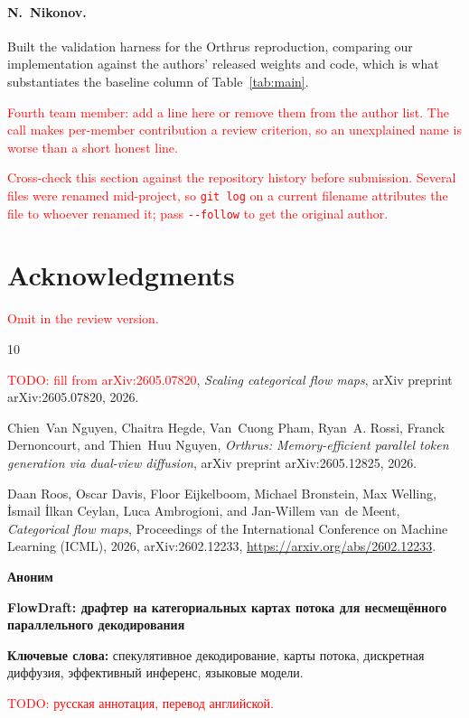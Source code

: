 \documentclass{zapiski}
\newcommand{\cm}[1]{\textcolor{red}{#1}}
\begin{document}
\paragraph{N.~Nikonov.} Built the validation harness for the Orthrus
reproduction, comparing our implementation against the authors' released
weights and code, which is what substantiates the baseline column of
Table~\ref{tab:main}.

\cm{Fourth team member: add a line here or remove them from the author list.
The call makes per-member contribution a review criterion, so an unexplained
name is worse than a short honest line.}

\cm{Cross-check this section against the repository history before submission.
Several files were renamed mid-project, so \texttt{git log} on a current
filename attributes the file to whoever renamed it; pass \texttt{-{}-follow} to
get the original author.}

\section*{Acknowledgments}
\cm{Omit in the review version.}

\providecommand{\bysame}{\leavevmode\hbox to3em{\hrulefill}\thinspace}
\providecommand{\href}[2]{#2}
\begin{thebibliography}{10}

\cm{TODO: fill from arXiv:2605.07820}, \emph{Scaling categorical flow maps},
  arXiv preprint arXiv:2605.07820, 2026.

Chien~Van Nguyen, Chaitra Hegde, Van~Cuong Pham, Ryan~A. Rossi, Franck
  Dernoncourt, and Thien~Huu Nguyen, \emph{Orthrus: Memory-efficient parallel
  token generation via dual-view diffusion}, arXiv preprint arXiv:2605.12825,
  2026.

Daan Roos, Oscar Davis, Floor Eijkelboom, Michael Bronstein, Max Welling,
  İsmail İlkan Ceylan, Luca Ambrogioni, and Jan-Willem van~de Meent,
  \emph{Categorical flow maps}, Proceedings of the International Conference on
  Machine Learning (ICML), 2026, arXiv:2602.12233,
  \url{https://arxiv.org/abs/2602.12233}.

\end{thebibliography}

\vspace{1cm}
\noindent\textbf{Аноним}

\smallskip
\noindent\textbf{FlowDraft: драфтер на категориальных картах потока для
несмещённого параллельного декодирования}

\smallskip
\noindent\textbf{Ключевые слова:} спекулятивное декодирование, карты потока,
дискретная диффузия, эффективный инференс, языковые модели.

\smallskip
\noindent\cm{TODO: русская аннотация, перевод английской.}
\end{document}
